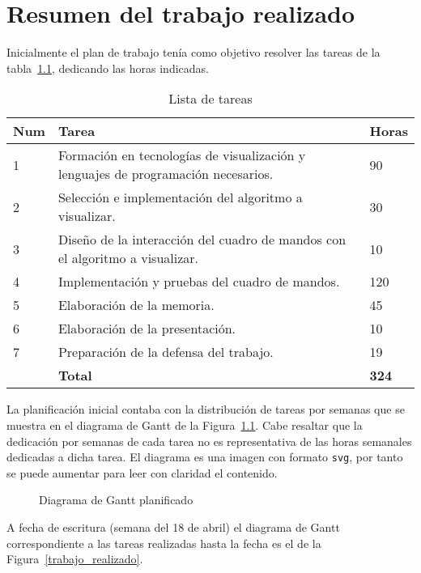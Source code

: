 \chapter{Resumen del trabajo realizado}
\label{ch:trabajo_realizado}

Inicialmente el plan de trabajo tenía como objetivo resolver las tareas de la tabla~\ref{lista_tareas}, dedicando las horas indicadas.

\begin{table}[h]
\centering
\begin{tabular}{|p{1cm}|p{11cm}|p{1.1cm}|}
\hline
\textbf{Num} & \textbf{Tarea} & \textbf{Horas}\\
\hline\hline
1 & Formación en tecnologías de visualización y lenguajes de programación necesarios. & 90\\
\hline
2 & Selección e implementación del algoritmo a visualizar. & 30\\
\hline
3 & Diseño de la interacción del cuadro de mandos con el algoritmo a visualizar. & 10\\
\hline
4 & Implementación y pruebas del cuadro de mandos. & 120\\
\hline
5 & Elaboración de la memoria. & 45\\
\hline
6 & Elaboración de la presentación. & 10\\
\hline
7 & Preparación de la defensa del trabajo. & 19\\
\hline\hline
\textbf{} & \textbf{Total} & \textbf{324}\\
\hline
\end{tabular}
\caption{Lista de tareas}
\label{lista_tareas}
\end{table}

La planificación inicial contaba con la distribución de tareas por semanas que se muestra en el diagrama de Gantt de la Figura~\ref{plan_trabajo}. Cabe resaltar que la dedicación por semanas de cada tarea no es representativa de las horas semanales dedicadas a dicha tarea. El diagrama es una imagen con formato \texttt{svg}, por tanto se puede aumentar para leer con claridad el contenido.

\begin{figure}[h]
	{\fontsize{3}{4}\selectfont
		\centering
    	\def\svgscale{0.185}
    	
    	\caption{Diagrama de Gantt planificado}
    	\label{plan_trabajo}
	}
\end{figure}

A fecha de escritura (semana del 18 de abril) el diagrama de Gantt correspondiente a las tareas realizadas hasta la fecha es el de la Figura~\ref{trabajo_realizado}.

